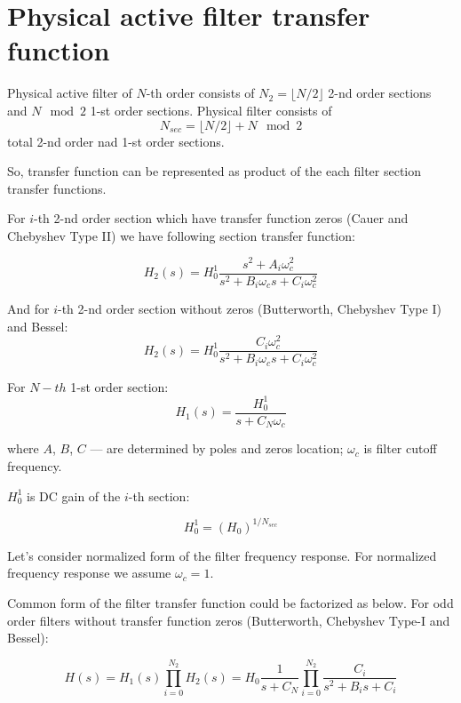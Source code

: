\section{Physical active filter transfer function}

Physical active filter of $N$-th order consists of $N_{2} = \lfloor N/2\rfloor$
2-nd order sections and $N\mod 2$ 1-st order sections. Physical filter consists
of
\begin{equation}
 N_{sec}=\lfloor N/2\rfloor+N\mod 2 \label{order-sections}
\end{equation}
total 2-nd order nad 1-st order sections.

So, transfer function can be represented as product of the each filter section
transfer functions.

For $i$-th 2-nd order section which have transfer function zeros (Cauer and
Chebyshev Type II) we have following section transfer function:

\begin{equation}
 H_2(s)=H_0^1\frac{s^2+A_i\omega_c^2}{s^2+B_i\omega_c s+C_i\omega_c^2}
\label{2ord1}
\end{equation}

And for $i$-th 2-nd order section without zeros (Butterworth, Chebyshev Type I)
and Bessel:
\begin{equation}
 H_2(s)=H_0^1\frac{C_i\omega_c^2}{s^2+B_i\omega_c s+C_i\omega_c^2} \label{2ord2}
\end{equation}

For $N-th$ 1-st order section:
\begin{equation}
 H_1(s)=\frac{H_0^1}{s+C_N\omega_c} \label{1ord}
\end{equation}


where $A$, $B$, $C$ --- are determined by poles and zeros location; $\omega_c$
is filter cutoff frequency.

$H_0^1$ is DC gain of the $i$-th section:

\begin{equation}
 H_0^1 = (H_0)^{1/N_{sec}} 
\end{equation}

Let's consider normalized form of the filter frequency response.
For normalized frequency response we assume $\omega_c=1$.

Common form of the filter transfer function could be factorized as below. For
odd order filters without transfer function zeros (Butterworth, Chebyshev Type-I
and Bessel):

\begin{equation}
 H(s)=H_1(s)\prod_{i=0}^{N_2}H_2(s) = 
 H_0\frac{1}{s+C_N}\prod_{i=0}^{N_2}\frac{C_i}{s^2+B_i s+C_i}
\end{equation}

